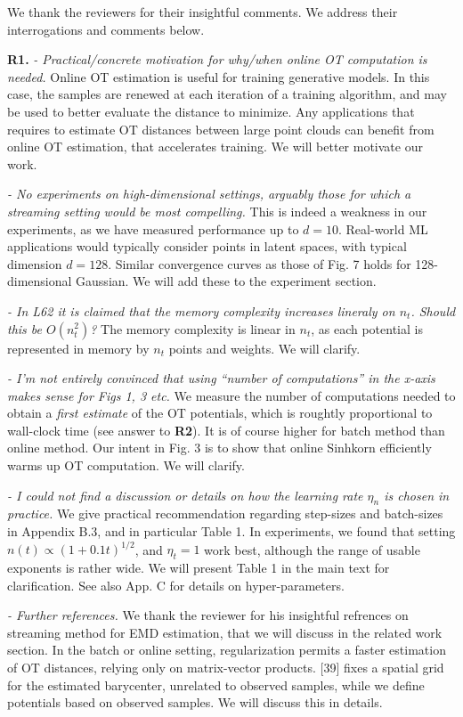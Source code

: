 \documentclass{article}
\begin{document}
We thank the reviewers for their insightful comments. We address their interrogations and comments below.

\textbf{R1.} \textit{- Practical/concrete motivation for why/when online OT computation is needed.} Online OT estimation is useful for training generative models. In this case, the samples are renewed at each iteration of a training algorithm, and may be used to better evaluate the distance to minimize. Any applications that requires to estimate OT distances between large point clouds can benefit from online OT estimation, that accelerates training. We will better motivate our work.

\textit{- No experiments on high-dimensional settings, arguably those for which a streaming setting would be most compelling.} This is indeed a weakness in our experiments, as we have measured performance up to $d=10$. Real-world ML applications would typically consider points in latent spaces, with typical dimension $d=128$. Similar convergence curves as those of Fig. 7 holds for 128-dimensional Gaussian. We will add these to the experiment section.

\textit{- In L62 it is claimed that the memory complexity increases lineraly on $n_t$. Should this be $O(n_t^2)$?} The memory complexity is linear in $n_t$, as each potential is represented in memory by $n_t$ points and weights. We will clarify.

\textit{- I’m not entirely convinced that using “number of computations” in the x-axis makes sense for Figs 1, 3 etc.} We measure the number of computations needed to obtain a \textit{first estimate} of the OT potentials, which is roughtly proportional to wall-clock time (see answer to \textbf{R2}). It is of course higher for batch method than online method. Our intent in Fig. 3 is to show that online Sinhkorn efficiently warms up OT computation. We will clarify.

\textit{- I could not find a discussion or details on how the learning rate $\eta_n$ is chosen in practice.} We give practical recommendation regarding step-sizes and batch-sizes in Appendix B.3, and in particular Table 1. In experiments, we found that setting $n(t) \propto (1 + 0.1t)^{1/2}$, and $\eta_t = 1$ work best, although the range of usable exponents is rather wide. We will present Table 1 in the main text for clarification. See also App. C for details on hyper-parameters.

\textit{- Further references.} We thank the reviewer for his insightful refrences on streaming method for EMD estimation, that we will discuss in the related work section. In the batch or online setting, regularization permits a faster estimation of OT distances, relying only on matrix-vector products. [39] fixes a spatial grid for the estimated barycenter, unrelated to observed samples, while we define potentials based on observed samples. We will discuss this in details.
\end{document}
